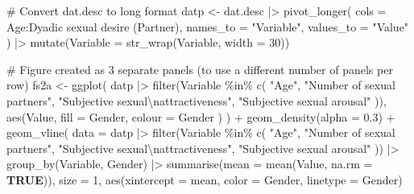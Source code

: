 \documentclass[
  bookmarksnumbered]{article}
\newenvironment{Shaded}{\begin{snugshade}}{\end{snugshade}}
\newcommand{\AttributeTok}[1]{\textcolor[rgb]{0.80,0.80,0.80}{#1}}
\newcommand{\CommentTok}[1]{\textcolor[rgb]{0.50,0.62,0.50}{#1}}
\newcommand{\ConstantTok}[1]{\textcolor[rgb]{0.86,0.64,0.64}{\textbf{#1}}}
\newcommand{\DecValTok}[1]{\textcolor[rgb]{0.86,0.86,0.80}{#1}}
\newcommand{\FloatTok}[1]{\textcolor[rgb]{0.75,0.75,0.82}{#1}}
\newcommand{\FunctionTok}[1]{\textcolor[rgb]{0.94,0.94,0.56}{#1}}
\newcommand{\NormalTok}[1]{\textcolor[rgb]{0.80,0.80,0.80}{#1}}
\newcommand{\OtherTok}[1]{\textcolor[rgb]{0.94,0.94,0.56}{#1}}
\newcommand{\SpecialCharTok}[1]{\textcolor[rgb]{0.86,0.64,0.64}{#1}}
\newcommand{\StringTok}[1]{\textcolor[rgb]{0.80,0.58,0.58}{#1}}
\begin{document}
\begin{Shaded}
\begin{Highlighting}[]
\CommentTok{\# Convert dat.desc to long format}
\NormalTok{datp }\OtherTok{\textless{}{-}}\NormalTok{ dat.desc }\SpecialCharTok{|\textgreater{}}
  \FunctionTok{pivot\_longer}\NormalTok{(}
    \AttributeTok{cols =}\NormalTok{ Age}\SpecialCharTok{:}\StringTok{\textasciigrave{}}\AttributeTok{Dyadic sexual desire (Partner)}\StringTok{\textasciigrave{}}\NormalTok{,}
    \AttributeTok{names\_to =} \StringTok{"Variable"}\NormalTok{,}
    \AttributeTok{values\_to =} \StringTok{"Value"}
\NormalTok{  ) }\SpecialCharTok{|\textgreater{}}
  \FunctionTok{mutate}\NormalTok{(}\AttributeTok{Variable =} \FunctionTok{str\_wrap}\NormalTok{(Variable, }\AttributeTok{width =} \DecValTok{30}\NormalTok{))}

\CommentTok{\# Figure created as 3 separate panels (to use a different number of panels per row)}
\NormalTok{fs2a }\OtherTok{\textless{}{-}} \FunctionTok{ggplot}\NormalTok{(}
\NormalTok{  datp }\SpecialCharTok{|\textgreater{}}
    \FunctionTok{filter}\NormalTok{(Variable }\SpecialCharTok{\%in\%} \FunctionTok{c}\NormalTok{(}
      \StringTok{"Age"}\NormalTok{,}
      \StringTok{"Number of sexual partners"}\NormalTok{,}
      \StringTok{"Subjective sexual}\SpecialCharTok{\textbackslash{}n}\StringTok{attractiveness"}\NormalTok{,}
      \StringTok{"Subjective sexual arousal"}
\NormalTok{    )),}
  \FunctionTok{aes}\NormalTok{(Value,}
    \AttributeTok{fill =}\NormalTok{ Gender,}
    \AttributeTok{colour =}\NormalTok{ Gender}
\NormalTok{  )}
\NormalTok{) }\SpecialCharTok{+}
  \FunctionTok{geom\_density}\NormalTok{(}\AttributeTok{alpha =} \FloatTok{0.3}\NormalTok{) }\SpecialCharTok{+}
  \FunctionTok{geom\_vline}\NormalTok{(}
    \AttributeTok{data =}\NormalTok{ datp }\SpecialCharTok{|\textgreater{}}
      \FunctionTok{filter}\NormalTok{(Variable }\SpecialCharTok{\%in\%} \FunctionTok{c}\NormalTok{(}
        \StringTok{"Age"}\NormalTok{,}
        \StringTok{"Number of sexual partners"}\NormalTok{,}
        \StringTok{"Subjective sexual}\SpecialCharTok{\textbackslash{}n}\StringTok{attractiveness"}\NormalTok{,}
        \StringTok{"Subjective sexual arousal"}
\NormalTok{      )) }\SpecialCharTok{|\textgreater{}}
      \FunctionTok{group\_by}\NormalTok{(Variable, Gender) }\SpecialCharTok{|\textgreater{}}
      \FunctionTok{summarise}\NormalTok{(}\AttributeTok{mean =} \FunctionTok{mean}\NormalTok{(Value, }\AttributeTok{na.rm =} \ConstantTok{TRUE}\NormalTok{)),}
    \AttributeTok{size =} \DecValTok{1}\NormalTok{,}
    \FunctionTok{aes}\NormalTok{(}\AttributeTok{xintercept =}\NormalTok{ mean, }\AttributeTok{color =}\NormalTok{ Gender, }\AttributeTok{linetype =}\NormalTok{ Gender)}

\end{Highlighting}
\end{Shaded}
\end{document}
